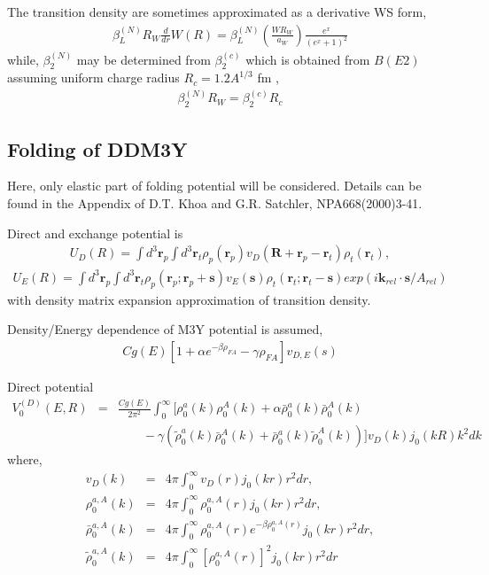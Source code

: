 \documentclass[11pt]{book}
\def\bm{\boldsymbol}
\def\vk{{\bm k}}
\def\vr{{\bm r}}
\def\vR{{\bm R}}
\newcommand{\bea}{\begin{eqnarray}}
\newcommand{\eea}{\end{eqnarray}}
\newcommand{\no}{\nonumber \\}
\begin{document}
The transition density are sometimes approximated as a derivative WS form,
\bea 
\beta_{L}^{(N)} R_{W} \frac{d}{dr} W(R) = \beta_{L}^{(N)}(\frac{W R_W}{a_W})\frac{e^x}{(e^x+1)^2}
\eea 
while, $\beta_2^{(N)}$ may be determined from $\beta_2^{(c)}$ which 
is obtained from $B(E2)$ assuming uniform charge radius $R_c=1.2 A^{1/3}$ fm ,
\bea 
\beta_2^{(N)} R_W = \beta_2^{(c)} R_c
\eea 

\subsection{Folding of DDM3Y}
Here, only elastic part of folding potential will be considered. 
Details can be found in the Appendix of D.T. Khoa and G.R. Satchler, NPA668(2000)3-41. 

Direct and exchange potential is 
\bea 
U_D(R)= \int d^3 \vr_p \int d^3 \vr_t \rho_{p}(\vr_p) v_D(\vR+\vr_p-\vr_t) \rho_{t}(\vr_t),
\eea
\bea 
U_E(R) = \int d^3\vr_p \int d^3\vr_t  \rho_p(\vr_p;\vr_p+{\bm s}) v_E({\bm s})\rho_t(\vr_t;\vr_t-{\bm s}) exp( i\vk_{rel}\cdot{\bm s} /A_{rel}) 
\eea 
with density matrix expansion approximation of transition density. 

Density/Energy dependence of M3Y potential is assumed,
\bea 
C g(E) [1 +\alpha e^{-\beta \rho_{FA}}-\gamma \rho_{FA}] v_{D,E}(s)
\eea 

Direct potential
\bea 
V_0^{(D)}(E,R)&=& \frac{ C g(E)}{2\pi^2}\int_0^\infty \Big[
                     \rho^a_0(k) \rho^A_0(k) +\alpha \bar{\rho}^a_0(k)\bar{\rho}^A_0(k)
                \no & &\quad\quad      
                     -\gamma (\tilde{\rho}^a_0(k)\bar{\rho}^A_0(k)+\bar{\rho}^a_0(k)\tilde{\rho}^A_0(k) )
                   \Big] v_D(k) j_0(k R) k^2 dk   
\eea 
where,
\bea 
v_D(k) &=& 4\pi\int_0^\infty v_D(r) j_0(k r) r^2 dr,\no 
\rho^{a,A}_0(k)&=&4\pi\int_0^\infty \rho^{a,A}_0(r) j_0(k r) r^2 dr ,\no 
\bar{\rho}^{a,A}_0(k)&=&4\pi\int_0^\infty \rho^{a,A}_0(r) e^{-\beta \rho^{a,A}_0(r) }j_0(k r) r^2 dr ,\no 
\tilde{\rho}^{a,A}_0(k)&=&4\pi\int_0^\infty [\rho^{a,A}_0(r)]^2 j_0(k r) r^2 dr
\eea 
\end{document}
